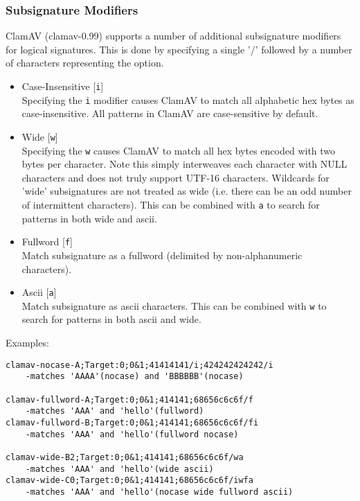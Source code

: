 \documentclass[a4paper,titlepage,12pt]{article}
\begin{document}
    \subsubsection{Subsignature Modifiers}
    ClamAV (clamav-0.99) supports a number of additional subsignature modifiers
    for logical signatures. This is done by specifying a single '/' followed
    by a number of characters representing the option.
    \begin{itemize}
    \item Case-Insensitive [\verb+i+]\\
      Specifying the \verb+i+ modifier causes ClamAV to match all alphabetic
      hex bytes as case-insensitive. All patterns in ClamAV are case-sensitive
      by default.
    \item Wide [\verb+w+]\\
      Specifying the \verb+w+ causes ClamAV to match all hex bytes encoded with
      two bytes per character. Note this simply interweaves each character with
      NULL characters and does not truly support UTF-16 characters. Wildcards for
      'wide' subsignatures are not treated as wide (i.e. there can be an odd number
      of intermittent characters). This can be combined with \verb+a+ to search for
      patterns in both wide and ascii.
    \item Fullword [\verb+f+]\\
      Match subsignature as a fullword (delimited by non-alphanumeric characters).
    \item Ascii [\verb+a+]\\
      Match subsignature as ascii characters. This can be combined with \verb+w+
      to search for patterns in both ascii and wide.
    \end{itemize}
    Examples:
    \begin{verbatim}
clamav-nocase-A;Target:0;0&1;41414141/i;424242424242/i
    -matches 'AAAA'(nocase) and 'BBBBBB'(nocase)

clamav-fullword-A;Target:0;0&1;414141;68656c6c6f/f
    -matches 'AAA' and 'hello'(fullword)
clamav-fullword-B;Target:0;0&1;414141;68656c6c6f/fi
    -matches 'AAA' and 'hello'(fullword nocase)

clamav-wide-B2;Target:0;0&1;414141;68656c6c6f/wa
    -matches 'AAA' and 'hello'(wide ascii)
clamav-wide-C0;Target:0;0&1;414141;68656c6c6f/iwfa
    -matches 'AAA' and 'hello'(nocase wide fullword ascii)
    \end{verbatim}
\end{document}
